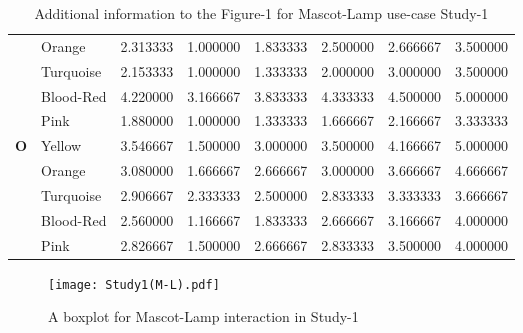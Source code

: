\begin{table}[H]
\begin{center}
\begin{tabular}{ |p{0.5cm}| p{2cm}|p{1.5cm}|p{1.5cm}| p{1.5cm}|p{1.5cm}|p{1.5cm}| p{1.5cm}| }
&Orange & 2.313333 & 1.000000 &1.833333 &2.500000 &2.666667 &3.500000\\
&Turquoise & 2.153333 & 1.000000 &1.333333 &2.000000 &3.000000 &3.500000\\
&Blood-Red & 4.220000 & 3.166667 &3.833333 &4.333333 &4.500000 &5.000000\\
&Pink & 1.880000 & 1.000000 &1.333333 &1.666667 &2.166667 &3.333333\\
 \hline 
 \hline 
 \multirow{5}{*}{\textbf{O}} 
&Yellow & 3.546667 & 1.500000 &3.000000 &3.500000 &4.166667 &5.000000\\
&Orange & 3.080000 & 1.666667 &2.666667 &3.000000 &3.666667 &4.666667\\
&Turquoise & 2.906667 & 2.333333 &2.500000 &2.833333 &3.333333 &3.666667\\
&Blood-Red & 2.560000 & 1.166667 &1.833333 &2.666667 &3.166667 &4.000000\\
&Pink & 2.826667 & 1.500000 &2.666667 &2.833333 &3.500000 &4.000000\\
 \hline 
\end{tabular}
\end{center}
\caption{Additional information to the Figure-1 for Mascot-Lamp use-case Study-1}
\label{table:medianML1}
\end{table}

\begin{figure}[H]
  \centering
    \texttt{[image: Study1(M-L).pdf]}
      \caption{A boxplot for Mascot-Lamp interaction in Study-1}
      \label{fig:ML1}
\end{figure}


